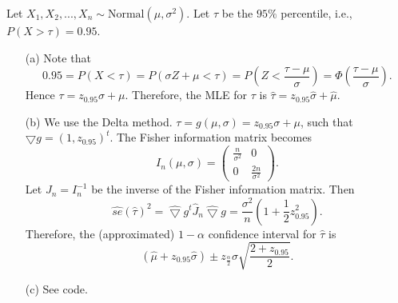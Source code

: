 Let $X_1, X_2, ..., X_n \sim \mathrm{Normal}(\mu, \sigma^2)$.
Let $\tau$ be the $95\%$ percentile, i.e., $P(X > \tau) = 0.95$.
\begin{itemize}
    \item[(a)] Note that
        \begin{equation*}
            0.95
                = P(X < \tau)
                = P(\sigma Z + \mu < \tau)
                = P\left(Z < \frac{\tau - \mu}{\sigma}\right)
                = \Phi\left(\frac{\tau - \mu}{\sigma}\right).
        \end{equation*}
        Hence $\tau = z_{0.95} \sigma + \mu$.
        Therefore, the MLE for $\tau$ is $\hat{\tau} = z_{0.95} \hat{\sigma} + \hat{\mu}$.
    \item[(b)] We use the Delta method.
        $\tau = g(\mu, \sigma) = z_{0.95} \sigma + \mu$, such that $\bigtriangledown g = (1, z_{0.95})^t$.
        The Fisher information matrix becomes
        \begin{equation*}
            I_n(\mu, \sigma) = \left( \begin{matrix}
                \frac{n}{\sigma^2} & 0 \\
                0 & \frac{2n}{\sigma^2}
            \end{matrix} \right).
        \end{equation*}
        Let $J_n = I_n^{-1}$ be the inverse of the Fisher information matrix.
        Then
        \begin{equation*}
            \hat{se}(\hat{\tau})^2
                = \hat{\bigtriangledown} g^t \hat{J}_n \hat{\bigtriangledown} g
                = \frac{\sigma^2}{n}\left(1 + \frac{1}{2} z_{0.95}^2\right).
        \end{equation*}
        Therefore, the (approximated) $1 - \alpha$ confidence interval for $\hat{\tau}$ is
        \begin{equation*}
            (\hat{\mu} + z_{0.95}\hat{\sigma}) \pm z_{\frac{\alpha}{2}} \sigma \sqrt{\frac{2 + z_{0.95}}{2}}.
        \end{equation*}
    \item[(c)] See code.
\end{itemize}
